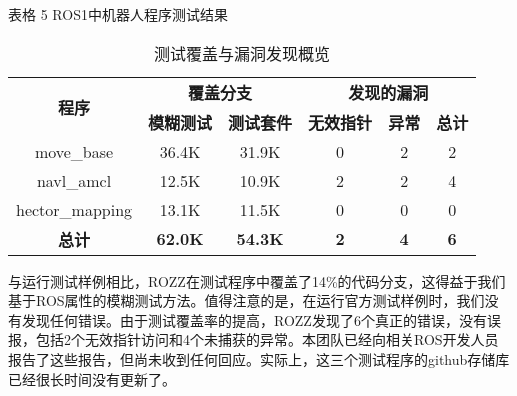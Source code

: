 表格 5 ROS1中机器人程序测试结果

\begin{table}[H]
\small
\caption{测试覆盖与漏洞发现概览}
\centering
\begin{tabular}{cccccc}
\hline
\multirow{2}{*}{\textbf{程序}} & \multicolumn{2}{c}{\textbf{覆盖分支}} & \multicolumn{3}{c}{\textbf{发现的漏洞}} \\
\cline{2-6}
& \textbf{模糊测试} & \textbf{测试套件} & \textbf{无效指针} & \textbf{异常} & \textbf{总计} \\
\hline
move\_base & 36.4K & 31.9K & 0 & 2 & 2 \\
navl\_amcl & 12.5K & 10.9K & 2 & 2 & 4 \\
hector\_mapping & 13.1K & 11.5K & 0 & 0 & 0 \\
\textbf{总计} & \textbf{62.0K} & \textbf{54.3K} & \textbf{2} & \textbf{4} & \textbf{6} \\
\hline
\end{tabular}
\end{table}

与运行测试样例相比，ROZZ在测试程序中覆盖了14\%的代码分支，这得益于我们基于ROS属性的模糊测试方法。值得注意的是，在运行官方测试样例时，我们没有发现任何错误。由于测试覆盖率的提高，ROZZ发现了6个真正的错误，没有误报，包括2个无效指针访问和4个未捕获的异常。本团队已经向相关ROS开发人员报告了这些报告，但尚未收到任何回应。实际上，这三个测试程序的github存储库已经很长时间没有更新了。
